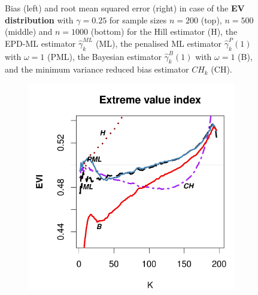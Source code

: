 \begin{figure}[h]
\begin{subfigure}[h]{0.40\linewidth}
		\end{subfigure}
	\caption{Bias (left) and root mean squared error (right) in case of the \textbf{EV distribution} with $\gamma=0.25$ for sample sizes $n=200$ (top), $n=500$ (middle) and $n=1000$ (bottom) for the Hill estimator (H), the EPD-ML estimator $\hat{\gamma}_{k}^{ML}$ (ML), the penalised ML estimator $\hat{\gamma}^P_{k}(1)$ with $\omega=1$ (PML), the Bayesian estimator $\hat{\gamma}^B_{k}(1)$ with $\omega=1$ (B), and the minimum variance reduced bias estimator $CH_k$ (CH).}
	\label{paper1:fig1}
\end{figure}
	\begin{figure}[h]
		\centering
		\begin{subfigure}[h]{0.40\linewidth}
			\includegraphics[width=\textwidth]{./plots/paper1/EVI_Outputfrehet0,5200.pdf}
		\end{subfigure}
		\hspace{\fill}
		\begin{subfigure}[h]{0.40\linewidth}

\end{subfigure}
\end{figure}
